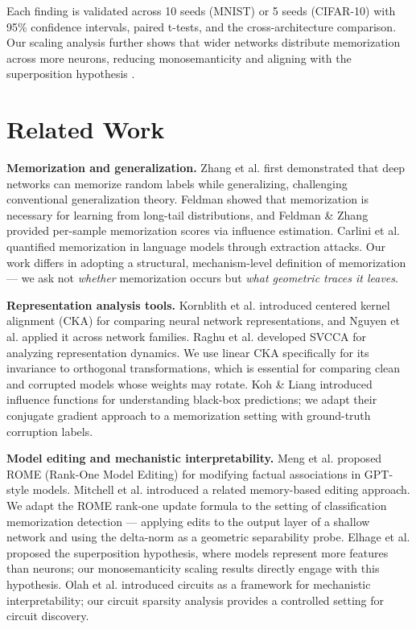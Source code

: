 \documentclass{article}
\begin{document}
Each finding is validated across 10 seeds (MNIST) or 5 seeds (CIFAR-10) with 95\% confidence intervals, paired t-tests, and the cross-architecture comparison. Our scaling analysis further shows that wider networks distribute memorization across more neurons, reducing monosemanticity and aligning with the superposition hypothesis \cite{elhage2022toy}.

\section{Related Work}
\label{sec:related}

\textbf{Memorization and generalization.} Zhang et al. \cite{zhang2017understanding} first demonstrated that deep networks can memorize random labels while generalizing, challenging conventional generalization theory. Feldman \cite{feldman2020does} showed that memorization is necessary for learning from long-tail distributions, and Feldman \& Zhang \cite{feldman2020what} provided per-sample memorization scores via influence estimation. Carlini et al. \cite{carlini2022quantifying} quantified memorization in language models through extraction attacks. Our work differs in adopting a structural, mechanism-level definition of memorization — we ask not \emph{whether} memorization occurs but \emph{what geometric traces it leaves}.

\textbf{Representation analysis tools.} Kornblith et al. \cite{kornblith2019similarity} introduced centered kernel alignment (CKA) for comparing neural network representations, and Nguyen et al. \cite{nguyen2021wide} applied it across network families. Raghu et al. \cite{raghu2017svcca} developed SVCCA for analyzing representation dynamics. We use linear CKA specifically for its invariance to orthogonal transformations, which is essential for comparing clean and corrupted models whose weights may rotate. Koh \& Liang \cite{koh2017understanding} introduced influence functions for understanding black-box predictions; we adapt their conjugate gradient approach to a memorization setting with ground-truth corruption labels.

\textbf{Model editing and mechanistic interpretability.} Meng et al. \cite{meng2022locating} proposed ROME (Rank-One Model Editing) for modifying factual associations in GPT-style models. Mitchell et al. \cite{mitchell2022memory} introduced a related memory-based editing approach. We adapt the ROME rank-one update formula to the setting of classification memorization detection — applying edits to the output layer of a shallow network and using the delta-norm as a geometric separability probe. Elhage et al. \cite{elhage2022toy} proposed the superposition hypothesis, where models represent more features than neurons; our monosemanticity scaling results directly engage with this hypothesis. Olah et al. \cite{olah2020zoom} introduced circuits as a framework for mechanistic interpretability; our circuit sparsity analysis provides a controlled setting for circuit discovery.
\end{document}
